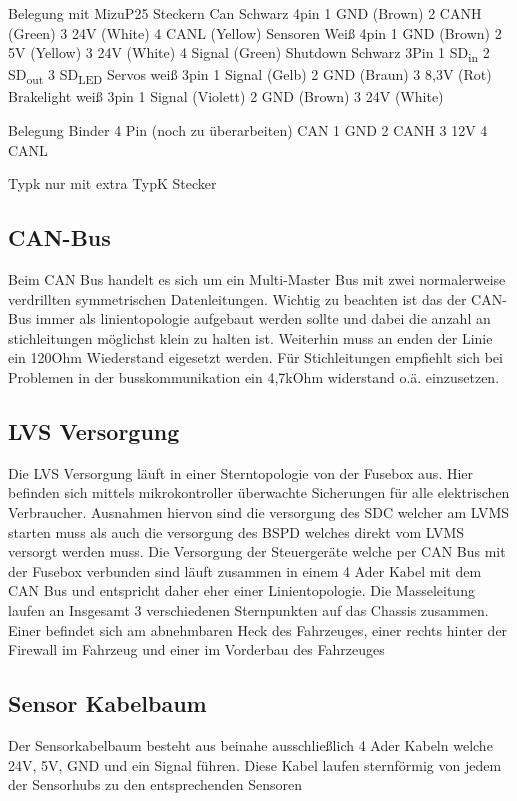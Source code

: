 Belegung mit MizuP25 Steckern
Can Schwarz 4pin
1 GND (Brown)
2 CANH (Green)
3 24V (White)
4 CANL (Yellow)
Sensoren Weiß 4pin 
1 GND (Brown)
2 5V (Yellow)
3 24V (White)
4 Signal (Green)
Shutdown Schwarz 3Pin
1 SD\textsubscript{in}
2 SD\textsubscript{out}
3 SD\textsubscript{LED}
Servos weiß 3pin
1 Signal (Gelb)
2 GND (Braun)
3 8,3V (Rot)
Brakelight weiß 3pin
1 Signal (Violett)
2 GND (Brown)
3 24V (White)

Belegung Binder 4 Pin (noch zu überarbeiten)
CAN
1 GND
2 CANH
3 12V
4 CANL

Typk nur mit extra TypK Stecker

\subsection{CAN-Bus}
Beim CAN Bus handelt es sich um ein Multi-Master Bus mit zwei normalerweise verdrillten symmetrischen Datenleitungen. Wichtig zu beachten ist das der CAN-Bus immer als linientopologie aufgebaut werden sollte und dabei die anzahl an stichleitungen möglichst klein zu halten ist. Weiterhin muss an enden der Linie ein 120Ohm Wiederstand eigesetzt werden. Für Stichleitungen empfiehlt sich bei Problemen in der busskommunikation ein 4,7kOhm widerstand o.ä. einzusetzen.

\subsection{LVS Versorgung}

Die LVS Versorgung läuft in einer Sterntopologie von der Fusebox aus. Hier befinden sich mittels mikrokontroller überwachte Sicherungen für alle elektrischen Verbraucher. Ausnahmen hiervon sind die versorgung des SDC welcher am LVMS starten muss als auch die versorgung des BSPD welches direkt vom LVMS versorgt werden muss. Die Versorgung der Steuergeräte welche per CAN Bus mit der Fusebox verbunden sind läuft zusammen in einem 4 Ader Kabel mit dem CAN Bus und entspricht daher eher einer Linientopologie. Die Masseleitung laufen an Insgesamt 3 verschiedenen Sternpunkten auf das Chassis zusammen. Einer befindet sich am abnehmbaren Heck des Fahrzeuges, einer rechts hinter der Firewall im Fahrzeug und einer im Vorderbau des Fahrzeuges

\subsection{Sensor Kabelbaum}

Der Sensorkabelbaum besteht aus beinahe ausschließlich 4 Ader Kabeln welche 24V, 5V, GND und ein Signal führen. Diese Kabel laufen sternförmig von jedem der Sensorhubs zu den entsprechenden Sensoren

